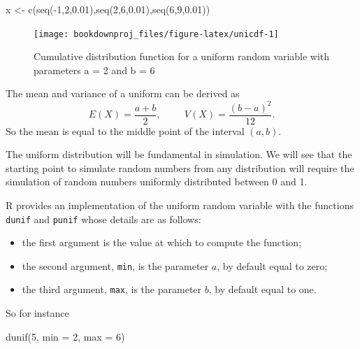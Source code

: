 \documentclass[
]{book}
\newenvironment{Shaded}{\begin{snugshade}}{\end{snugshade}}
\newcommand{\AttributeTok}[1]{\textcolor[rgb]{0.77,0.63,0.00}{#1}}
\newcommand{\DecValTok}[1]{\textcolor[rgb]{0.00,0.00,0.81}{#1}}
\newcommand{\FloatTok}[1]{\textcolor[rgb]{0.00,0.00,0.81}{#1}}
\newcommand{\FunctionTok}[1]{\textcolor[rgb]{0.00,0.00,0.00}{#1}}
\newcommand{\NormalTok}[1]{#1}
\newcommand{\OtherTok}[1]{\textcolor[rgb]{0.56,0.35,0.01}{#1}}
\newcommand{\SpecialCharTok}[1]{\textcolor[rgb]{0.00,0.00,0.00}{#1}}
\begin{document}
\begin{Shaded}
\begin{Highlighting}[]
\NormalTok{x }\OtherTok{\textless{}{-}} \FunctionTok{c}\NormalTok{(}\FunctionTok{seq}\NormalTok{(}\SpecialCharTok{{-}}\DecValTok{1}\NormalTok{,}\DecValTok{2}\NormalTok{,}\FloatTok{0.01}\NormalTok{),}\FunctionTok{seq}\NormalTok{(}\DecValTok{2}\NormalTok{,}\DecValTok{6}\NormalTok{,}\FloatTok{0.01}\NormalTok{),}\FunctionTok{seq}\NormalTok{(}\DecValTok{6}\NormalTok{,}\DecValTok{9}\NormalTok{,}\FloatTok{0.01}\NormalTok{))}
\end{Highlighting}
\end{Shaded}

\begin{figure}

{\centering \texttt{[image: bookdownproj\_files/figure-latex/unicdf-1]} 

}

\caption{Cumulative distribution function for a uniform random variable with parameters a = 2 and b = 6}\label{fig:unicdf}
\end{figure}

The mean and variance of a uniform can be derived as
\[
E(X)=\frac{a+b}{2}, \hspace{1cm} V(X)=\frac{(b-a)^2}{12}.
\]
So the mean is equal to the middle point of the interval \((a,b)\).

The uniform distribution will be fundamental in simulation. We will see that the starting point to simulate random numbers from any distribution will require the simulation of random numbers uniformly distributed between 0 and 1.

R provides an implementation of the uniform random variable with the functions \texttt{dunif} and \texttt{punif} whose details are as follows:

\begin{itemize}
\item
  the first argument is the value at which to compute the function;
\item
  the second argument, \texttt{min}, is the parameter \(a\), by default equal to zero;
\item
  the third argument, \texttt{max}, is the parameter \(b\), by default equal to one.
\end{itemize}

So for instance

\begin{Shaded}
\begin{Highlighting}[]
\FunctionTok{dunif}\NormalTok{(}\DecValTok{5}\NormalTok{, }\AttributeTok{min =} \DecValTok{2}\NormalTok{, }\AttributeTok{max =} \DecValTok{6}\NormalTok{)}
\end{Highlighting}
\end{Shaded}
\end{document}
